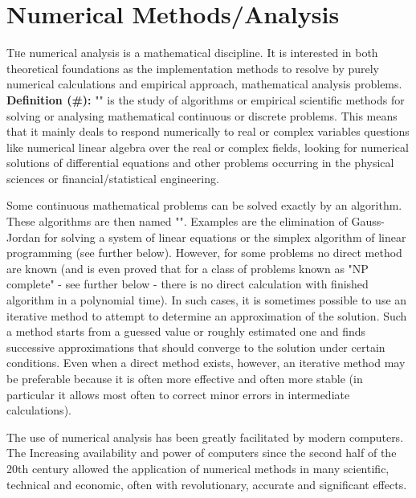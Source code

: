 	\newpage
	\thispagestyle{empty}
	\mbox{}
	\section{Numerical Methods/Analysis}
	
	\lettrine[lines=4]{\color{BrickRed}T}he numerical analysis is a mathematical discipline. It is interested in both theoretical foundations as the implementation methods to resolve by purely numerical calculations and empirical approach, mathematical analysis problems.\\
	
\textbf{Definition (\#\mydef):} "" is the study of algorithms or empirical scientific methods for solving or analysing mathematical continuous or discrete problems. This means that it mainly deals to respond numerically to real or complex variables questions like numerical linear algebra over the real or complex fields, looking for numerical solutions of differential equations and other problems occurring in the physical sciences or financial/statistical engineering.

Some continuous mathematical problems can be solved exactly by an algorithm. These algorithms are then named "". Examples are the elimination of Gauss-Jordan for solving a system of linear equations or the simplex algorithm of linear programming (see further below). However, for some problems no direct method are known (and is even proved that for a class of problems known as "NP complete" - see further below - there is no direct calculation with finished algorithm in a polynomial time). In such cases, it is sometimes possible to use an iterative method to attempt to determine an approximation of the solution. Such a method starts from a guessed value or roughly estimated one and finds successive approximations that should converge to the solution under certain conditions. Even when a direct method exists, however, an iterative method may be preferable because it is often more effective and often more stable (in particular it allows most often to correct minor errors in intermediate calculations).

	The use of numerical analysis has been greatly facilitated by modern computers. The Increasing availability and power of computers since the second half of the 20th century allowed the application of numerical methods in many scientific, technical and economic, often with revolutionary, accurate and significant effects.

